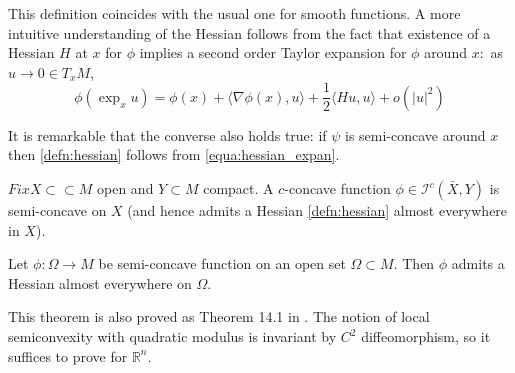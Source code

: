 This definition coincides with the usual one for smooth functions. A more intuitive understanding of the Hessian follows from the fact that existence of a Hessian \( H \) at \( x \) for \( \phi \) implies a second order Taylor expansion for \( \phi \) around \( x : \) as \( u \rightarrow 0 \in T _ { x } M \),
\begin{equation}
	\label{equa:hessian_expan}
	\phi \left( \exp _ { x } u \right) = \phi ( x ) + \langle \nabla \phi ( x ) , u \rangle + \frac { 1 } { 2 } \langle H u , u \rangle + o \left( | u | ^ { 2 } \right)
\end{equation}

It is remarkable that the converse also holds true: if \( \psi \) is semi-concave around \( x \) then \cref{defn:hessian} follows from \cref{equa:hessian_expan}.

\begin{prop}
	\( F i x X \subset \subset M \) open and \( Y \subset M \) compact. A \( c \)-concave function \( \phi \in \mathcal{I} ^ { c } ( \bar { X } , Y ) \) is semi-concave on \( X \) (and hence admits a Hessian \cref{defn:hessian} almost everywhere in \( X \)).
\end{prop}

\begin{thm}
	Let \( \phi : \Omega \rightarrow M \) be semi-concave function on an open set \( \Omega \subset M . \) Then \( \phi \) admits a Hessian almost everywhere on \( \Omega \).
\end{thm}

This theorem is also proved as Theorem 14.1 in \cite{villani2008optimal}.
The notion of local semiconvexity
with quadratic modulus is invariant by $C^2$ diffeomorphism, so it suffices to prove for $\mathbb{R}^n$.


